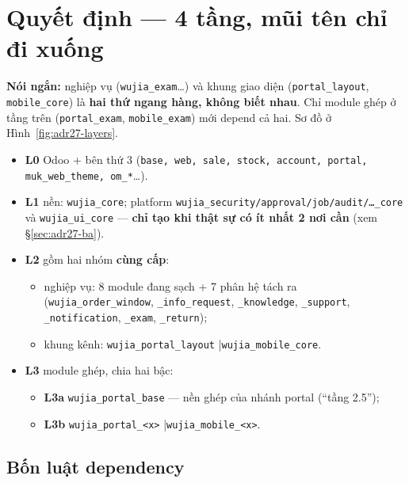 \section{Quyết định --- 4 tầng, mũi tên chỉ đi xuống}

\textbf{Nói ngắn:} nghiệp vụ (\texttt{wujia\_exam}\ldots) và khung giao diện
(\texttt{portal\_layout}, \texttt{mobile\_core}) là \textbf{hai thứ ngang hàng, không biết nhau}.
Chỉ module ghép ở tầng trên (\texttt{portal\_exam}, \texttt{mobile\_exam}) mới depend cả hai.
Sơ đồ ở Hình~\ref{fig:adr27-layers}.

\begin{itemize}
\item \textbf{L0} Odoo + bên thứ 3 (\texttt{base, web, sale, stock, account, portal, muk\_web\_theme, om\_*}\ldots).
\item \textbf{L1} nền: \texttt{wujia\_core}; platform \texttt{wujia\_security/approval/job/audit/\ldots\_core} và \texttt{wujia\_ui\_core} --- \textbf{chỉ tạo khi thật sự có ít nhất 2 nơi cần} (xem \S\ref{sec:adr27-ba}).
\item \textbf{L2} gồm hai nhóm \textbf{cùng cấp}:
  \begin{itemize}
  \item nghiệp vụ: 8 module đang sạch + 7 phân hệ tách ra (\texttt{wujia\_order\_window}, \texttt{\_info\_request}, \texttt{\_knowledge}, \texttt{\_support}, \texttt{\_notification}, \texttt{\_exam}, \texttt{\_return});
  \item khung kênh: \texttt{wujia\_portal\_layout} \quad|\quad \texttt{wujia\_mobile\_core}.
  \end{itemize}
\item \textbf{L3} module ghép, chia hai bậc:
  \begin{itemize}
  \item \textbf{L3a} \texttt{wujia\_portal\_base} --- nền ghép của nhánh portal (``tầng 2.5'');
  \item \textbf{L3b} \texttt{wujia\_portal\_<x>} \quad|\quad \texttt{wujia\_mobile\_<x>}.
  \end{itemize}
\end{itemize}

\adrLayerFigure

\subsection{Bốn luật dependency}

